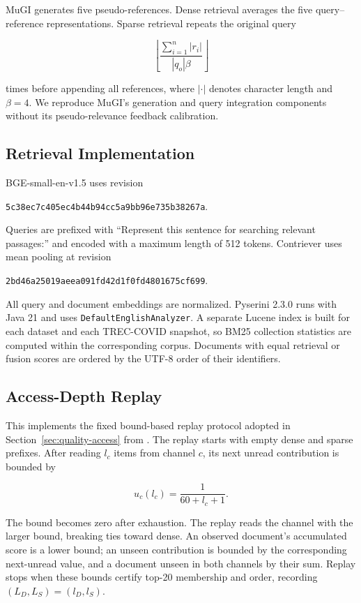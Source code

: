 MuGI generates five pseudo-references. Dense retrieval averages the five
query--reference representations. Sparse retrieval repeats the original query

\[
\left\lfloor\frac{\sum_{i=1}^{n}|r_i|}{|q_o|\beta}\right\rfloor
\]

times before appending all references, where $|\cdot|$ denotes character
length and $\beta=4$. We reproduce MuGI's generation and query integration
components without its pseudo-relevance feedback calibration.

\subsection{Retrieval Implementation}

BGE-small-en-v1.5 uses revision

{\footnotesize\noindent\texttt{5c38ec7c405ec4b44b94cc5a9bb96e735b38267a}.\par}

Queries are prefixed with
``Represent this sentence for searching relevant passages:'' and encoded
with a maximum length of 512 tokens. Contriever uses mean pooling at revision

{\footnotesize\noindent\texttt{2bd46a25019aeea091fd42d1f0fd4801675cf699}.\par}

All query and document embeddings are normalized. Pyserini 2.3.0 runs with
Java 21 and uses \texttt{DefaultEnglishAnalyzer}. A separate Lucene index is
built for each dataset and each TREC-COVID snapshot, so BM25 collection
statistics are computed within the corresponding corpus. Documents with equal
retrieval or fusion scores are ordered by the UTF-8 order of their identifiers.

\subsection{Access-Depth Replay}

This implements the fixed bound-based replay protocol adopted in
Section~\ref{sec:quality-access} from \citet{zhang2026exact}. The replay starts
with empty dense and sparse prefixes. After reading $l_c$
items from channel $c$, its next unread contribution is bounded by

\[
u_c(l_c)=\frac{1}{60+l_c+1}.
\]

The bound becomes zero after exhaustion. The replay reads the channel with the
larger bound, breaking ties toward dense. An observed document's accumulated
score is a lower bound; an unseen contribution is bounded by the corresponding
next-unread value, and a document unseen in both channels by their sum. Replay
stops when these bounds certify top-20 membership and order, recording
$(L_D,L_S)=(l_D,l_S)$.

